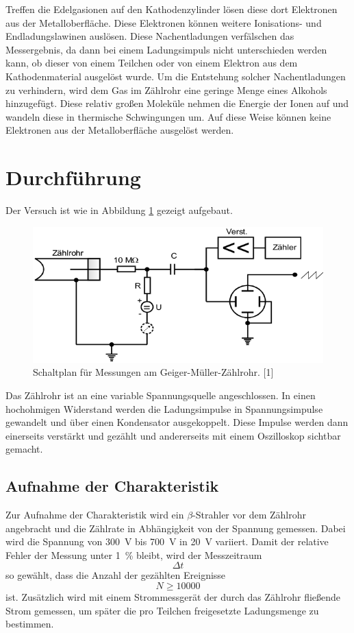 \documentclass[11pt,ngerman,a4paper]{article}
\begin{document}
\noindent
Treffen die Edelgasionen auf den Kathodenzylinder lösen diese dort Elektronen aus der Metalloberfläche. Diese Elektronen können weitere Ionisations- und Endladungslawinen auslösen. Diese Nachentladungen verfälschen das Messergebnis, da dann bei einem Ladungsimpuls nicht unterschieden werden kann, ob dieser von einem Teilchen oder von einem Elektron aus dem Kathodenmaterial ausgelöst wurde. Um die Entstehung solcher Nachentladungen zu verhindern, wird dem Gas im Zählrohr eine geringe Menge eines Alkohols hinzugefügt. Diese relativ großen Moleküle nehmen die Energie der Ionen auf und wandeln diese in thermische Schwingungen um. Auf diese Weise können keine Elektronen aus der Metalloberfläche ausgelöst werden.
\section{Durchführung}
Der Versuch ist wie in Abbildung \ref{abb4} gezeigt aufgebaut.
\begin{figure}[htp]
\centering
\includegraphics[scale=0.5]{abb4.png}
\caption{Schaltplan für Messungen am Geiger-Müller-Zählrohr. [1]}
\label{abb4}
\end{figure}
Das Zählrohr ist an eine variable Spannungsquelle angeschlossen. In einen hochohmigen Widerstand werden die Ladungsimpulse in Spannungsimpulse gewandelt und über einen Kondensator ausgekoppelt. Diese Impulse werden dann einerseits verstärkt und gezählt und andererseits mit einem Oszilloskop sichtbar gemacht.
\subsection{Aufnahme der Charakteristik}
Zur Aufnahme der Charakteristik wird ein $\beta$-Strahler vor dem Zählrohr angebracht und die Zählrate in Abhängigkeit von der Spannung gemessen. Dabei wird die Spannung von \SI{300}{\volt} bis \SI{700 }{\volt} in \SI{20}{\volt} variiert. Damit der relative Fehler der Messung unter \SI{1}{\percent} bleibt, wird der Messzeitraum
\[
\Delta t
\]
so gewählt, dass die Anzahl der gezählten Ereignisse
\[
N \geq \num{10000}
\]
ist. Zusätzlich wird mit einem Strommessgerät der durch das Zählrohr fließende Strom gemessen, um später die pro Teilchen freigesetzte Ladungsmenge zu bestimmen. 
\end{document}
